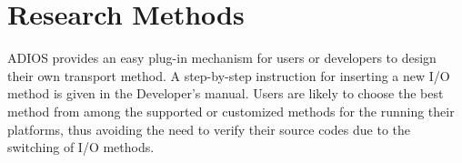 %
%
%
%
%
%

\section{Research Methods}

ADIOS provides an easy plug-in mechanism for users or developers to design their 
own transport method. A step-by-step instruction for inserting a new I/O method 
is given in the Developer's manual. Users are likely to choose the best method from among 
the supported or customized methods for the running their platforms, thus avoiding 
the need to verify their source codes due to the switching of I/O methods.

